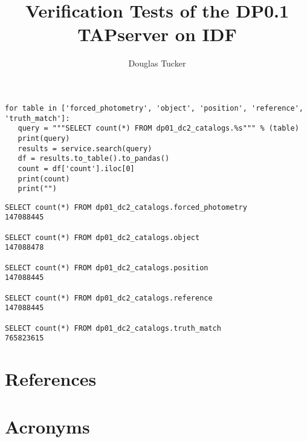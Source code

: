 \documentclass[DM,authoryear,toc]{lsstdoc}
\title{Verification Tests of the DP0.1 TAPserver on IDF}
\author{%
Douglas Tucker
}
\date{\vcsDate}
\begin{document}
\maketitle


\lstset{language=Python}
\begin{lstlisting}
for table in ['forced_photometry', 'object', 'position', 'reference', 'truth_match']:
   query = """SELECT count(*) FROM dp01_dc2_catalogs.%s""" % (table)
   print(query)
   results = service.search(query)
   df = results.to_table().to_pandas()
   count = df['count'].iloc[0]
   print(count)
   print("")
\end{lstlisting}

\lstset{language=SQL}
\begin{lstlisting}
SELECT count(*) FROM dp01_dc2_catalogs.forced_photometry
147088445

SELECT count(*) FROM dp01_dc2_catalogs.object
147088478

SELECT count(*) FROM dp01_dc2_catalogs.position
147088445
 
SELECT count(*) FROM dp01_dc2_catalogs.reference
147088445

SELECT count(*) FROM dp01_dc2_catalogs.truth_match
765823615
\end{lstlisting}


\appendix
\section{References} \label{sec:bib}
\renewcommand{\refname}{} %


\section{Acronyms} \label{sec:acronyms}

\end{document}
